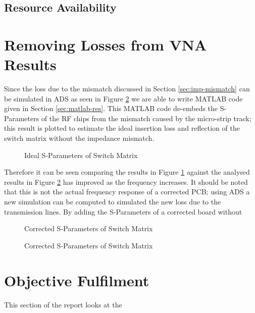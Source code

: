 \documentclass[12pt,openany,a4paper]{book}
\begin{document}
\subsection{Resource Availability}



\section{Removing Losses from VNA Results}
Since the loss due to the mismatch discussed in Section \ref{sec:imp-mismatch} can be simulated in ADS as seen in Figure \ref{} we are able to write MATLAB code given in Section \ref{sec:matlab-res}. This MATLAB code de-embeds the S-Parameters of the RF chips from the mismatch caused by the micro-strip track; this result is plotted to estimate the ideal insertion loss and reflection of the switch matrix without the impedance mismatch. 
\begin{figure}[H]
	\centering
	\caption{Ideal S-Parameters of Switch Matrix}
	\label{fig:ideal-switchmatrix}
\end{figure} 
Therefore it can be seen comparing the results in Figure \ref{fig:ideal-switchmatrix} against the analysed results in Figure \ref{} has improved as the frequency increases. It should be noted that this is not the actual frequency response of a corrected PCB; using ADS a new simulation can be computed to simulated the new loss due to the transmission lines. By adding the S-Parameters 
 of a corrected board without 
 
\begin{figure}[H]
	\centering
	\caption{Corrected S-Parameters of Switch Matrix}
	\label{fig:corrected-switchmatrix}
\end{figure}  
\begin{figure}[H]
	\centering
	\caption{Corrected S-Parameters of Switch Matrix}
	\label{fig:corrected-switchmatrix}
\end{figure} 







\section{Objective Fulfilment}
This section of the report looks at the 
\end{document}
